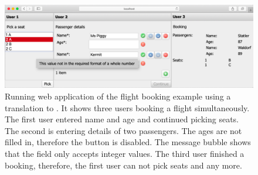 \begin{figure}[b]
  \includegraphics[width=\columnwidth]{figures/flight-booking.png}
  \caption{
    Running web application of the flight booking example using a translation to \ITASKS.
    It shows three users booking a flight simultaneously.
    The first user entered name and age and continued picking seats.
    The second is entering details of two passengers.
    The ages are not filled in, therefore the  button is disabled.
    The message bubble shows that the  field only accepts integer values.
    The third user finished a booking,
    therefore, the first user can not pick seats  and  any more.
  }
  \label{fig:flight-booking}
\end{figure}


